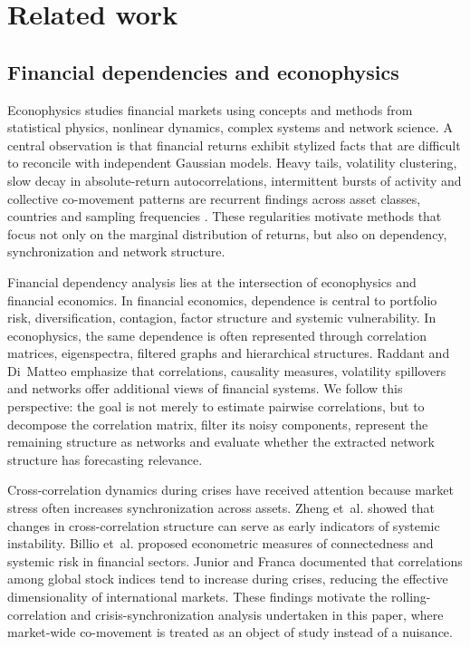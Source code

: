 \section{Related work}
\label{sec:related_work}

\subsection{Financial dependencies and econophysics}

Econophysics studies financial markets using concepts and methods from statistical physics, nonlinear dynamics, complex systems and network science. A central observation is that financial returns exhibit stylized facts that are difficult to reconcile with independent Gaussian models. Heavy tails, volatility clustering, slow decay in absolute-return autocorrelations, intermittent bursts of activity and collective co-movement patterns are recurrent findings across asset classes, countries and sampling frequencies \cite{mantegna_stanley_1999_book,cont_2001_empirical}. These regularities motivate methods that focus not only on the marginal distribution of returns, but also on dependency, synchronization and network structure.

Financial dependency analysis lies at the intersection of econophysics and financial economics. In financial economics, dependence is central to portfolio risk, diversification, contagion, factor structure and systemic vulnerability. In econophysics, the same dependence is often represented through correlation matrices, eigenspectra, filtered graphs and hierarchical structures. Raddant and Di~Matteo \cite{raddant_dimatteo_2023} emphasize that correlations, causality measures, volatility spillovers and networks offer additional views of financial systems. We follow this perspective: the goal is not merely to estimate pairwise correlations, but to decompose the correlation matrix, filter its noisy components, represent the remaining structure as networks and evaluate whether the extracted network structure has forecasting relevance.

Cross-correlation dynamics during crises have received attention because market stress often increases synchronization across assets. Zheng et~al. \cite{zheng_2012_changes} showed that changes in cross-correlation structure can serve as early indicators of systemic instability. Billio et~al. \cite{billio_2012_econometric} proposed econometric measures of connectedness and systemic risk in financial sectors. Junior and Franca \cite{junior_2012_correlation} documented that correlations among global stock indices tend to increase during crises, reducing the effective dimensionality of international markets. These findings motivate the rolling-correlation and crisis-synchronization analysis undertaken in this paper, where market-wide co-movement is treated as an object of study instead of a nuisance.

